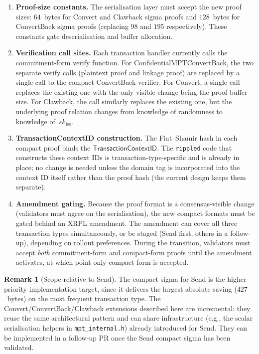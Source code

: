 \documentclass[11pt]{article}
\theoremstyle{definition}
\newtheorem{remark}[theorem]{Remark}
\newcommand{\sk}{\mathit{sk}}
\newcommand{\TransCtx}{\textsf{TransactionContextID}}
\begin{document}
\begin{enumerate}
  \item \textbf{Proof-size constants.}
    The serialisation layer must accept the new proof sizes:
    $64$~bytes for Convert and Clawback sigma proofs and $128$~bytes for
    ConvertBack sigma proofs (replacing $98$ and $195$
    respectively).
    These constants gate deserialisation and buffer allocation.

  \item \textbf{Verification call sites.}
    Each transaction handler currently calls the commitment-form
    verify function.
    For \textsf{ConfidentialMPTConvertBack}, the two separate verify
    calls (plaintext proof and linkage proof) are replaced by a
    single call to the compact ConvertBack verifier.
    For Convert, a single call replaces the existing one with the
    only visible change being the proof buffer size.
    For Clawback, the call similarly replaces the existing one, but
    the underlying proof relation changes from knowledge of
    randomness to knowledge of~$\sk_{\mathrm{iss}}$.

  \item \textbf{TransactionContextID construction.}
    The Fiat--Shamir hash in each compact proof binds the
    $\TransCtx$.
    The \texttt{rippled} code that constructs these context IDs is
    transaction-type-specific and is already in place; no change is
    needed unless the domain tag is incorporated into the
    context ID itself rather than the proof hash (the current
    design keeps them separate).

  \item \textbf{Amendment gating.}
    Because the proof format is a consensus-visible change (validators
    must agree on the serialisation), the new compact formats must be
    gated behind an XRPL amendment.
    The amendment can cover all three transaction types simultaneously,
    or be staged (Send first, others in a follow-up), depending on
    rollout preferences.
    During the transition, validators must accept \emph{both}
    commitment-form and compact-form proofs until the amendment
    activates, at which point only compact form is accepted.
\end{enumerate}

\begin{remark}[Scope relative to Send]
  The compact sigma for \textsf{Send} is the higher-priority
  implementation target, since it delivers the largest absolute saving
  ($427$~bytes) on the most frequent transaction type.
  The Convert/ConvertBack/Clawback extensions described here are
  incremental: they reuse the same architectural pattern and can share
  infrastructure (e.g., the scalar serialisation helpers in
  \texttt{mpt\_internal.h}) already introduced for Send.
  They can be implemented in a follow-up PR once the Send compact
  sigma has been validated.
\end{remark}
\end{document}
